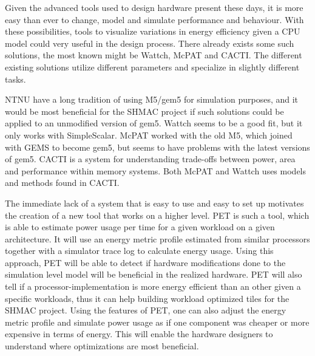 Given the advanced tools used to design hardware present these days, it is more
easy than ever to change, model and simulate performance and behaviour. With
these possibilities, tools to visualize variations in energy efficiency given a
CPU model could very useful in the design process. There already exists some
such solutions, the most known might be Wattch\cite{brooks2000wattch},
McPAT\cite{hpmcpat,li2013mcpat} and CACTI\cite{hpcacti}. The different existing
solutions utilize different parameters and specialize in slightly different
tasks.

NTNU have a long tradition of using M5/gem5 for simulation purposes, and it
would be most beneficial for the SHMAC project if such solutions could be
applied to an unmodified version of gem5. Wattch seems to be a good fit, but it
only works with SimpleScalar\cite{wattchanalysis}. McPAT worked with the old
M5\cite{m5mcpatparser}, which joined with GEMS to become gem5\cite{gem5hipeac},
but seems to have problems with the latest versions of
gem5\cite{mcpatgem5problems}. CACTI is a system for understanding trade-offs
between power, area and performance within memory
systems\cite{hpcacti,muralimanohar2010memory}. Both McPAT and Wattch uses models
and methods found in CACTI\cite{li2009mcpat}.

The immediate lack of a system that is easy to use and easy to set up motivates
the creation of a new tool that works on a higher level. PET is such a tool,
which is able to estimate power usage per time for a given workload on a given
architecture.  It will use an energy metric profile estimated from similar
processors together with a simulator trace log to calculate energy usage.  Using
this approach, PET will be able to detect if hardware modifications done to the
simulation level model will be beneficial in the realized hardware. PET will
also tell if a processor-implementation is more energy efficient than an other
given a specific workloads, thus it can help building workload optimized tiles
for the SHMAC project\cite{shmacwebpage}. Using the features of PET, one can
also adjust the energy metric profile and simulate power usage as if one
component was cheaper or more expensive in terms of energy. This will enable the
hardware designers to understand where optimizations are most beneficial.



